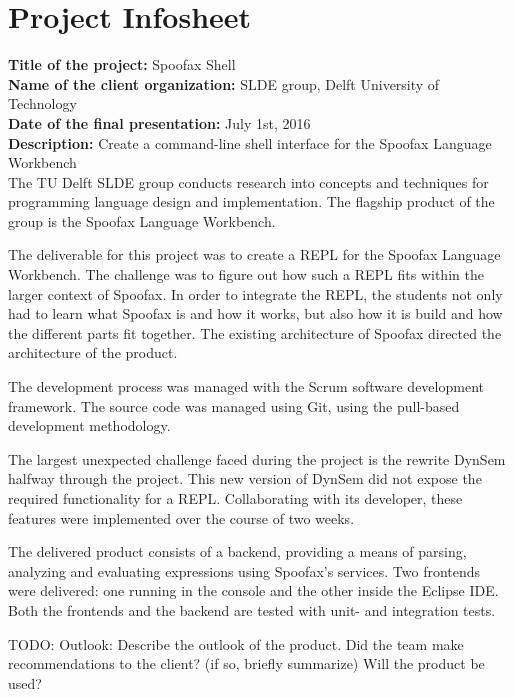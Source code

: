\chapter{Project Infosheet}
\label{cha:infosheet}
\newpage

\noindent
\textbf{Title of the project:} Spoofax Shell\\
\textbf{Name of the client organization:} SLDE group, Delft University of Technology\\
\textbf{Date of the final presentation:} July 1st, 2016\\
\textbf{Description:} Create a command-line shell interface for the Spoofax
Language Workbench\\

The TU Delft SLDE group conducts research into concepts and techniques for
programming language design and implementation. The flagship product of the
group is the Spoofax Language Workbench.

The deliverable for this project was to create a REPL for the Spoofax Language
Workbench. The challenge was to figure out how such a REPL fits within the larger
context of Spoofax. In order to integrate the REPL, the students not only had
to learn what Spoofax is and how it works, but also how it is build and how the
different parts fit together. The existing architecture of Spoofax directed the
architecture of the product.

The development process was managed with the Scrum software development
framework. The source code was managed using Git, using the pull-based
development methodology.

The largest unexpected challenge faced during the project is the rewrite DynSem
halfway through the project. This new version of DynSem did not expose the
required functionality for a REPL. Collaborating with its developer, these
features were implemented over the course of two weeks.

The delivered product consists of a backend, providing a means of parsing,
analyzing and evaluating expressions using Spoofax's services. Two frontends
were delivered: one running in the console and the other inside the Eclipse IDE.
Both the frontends and the backend are tested with unit- and integration tests.

TODO: Outlook: Describe the outlook of the product. Did the team make recommendations to the 
client? (if so, briefly summarize) Will the product be used?\\

